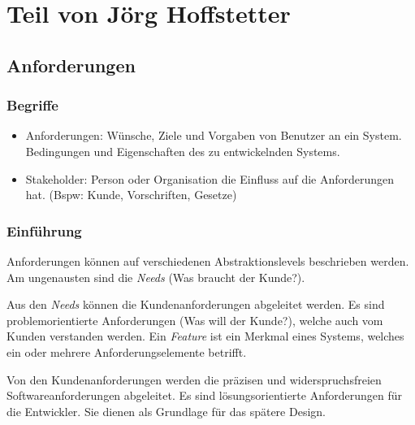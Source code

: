 \chapter{Teil von Jörg Hoffstetter}

\section{Anforderungen}

\subsection{Begriffe}
\begin{itemize}
	\item Anforderungen: Wünsche, Ziele und Vorgaben von Benutzer an ein System. Bedingungen und Eigenschaften des zu entwickelnden Systems.
	\item Stakeholder: Person oder Organisation die Einfluss auf die Anforderungen hat. (Bspw: Kunde, Vorschriften, Gesetze)
\end{itemize}

\subsection{Einführung}

Anforderungen können auf verschiedenen Abstraktionslevels beschrieben werden. Am ungenausten sind die \emph{Needs} (Was braucht der Kunde?).

Aus den \emph{Needs} können die Kundenanforderungen abgeleitet werden. Es sind problemorientierte Anforderungen (Was will der Kunde?), welche auch vom Kunden verstanden werden. Ein \emph{Feature} ist ein Merkmal eines Systems, welches ein oder mehrere Anforderungselemente betrifft.

Von den Kundenanforderungen werden die präzisen und widerspruchsfreien Softwareanforderungen abgeleitet. Es sind lösungsorientierte Anforderungen für die Entwickler. Sie dienen als Grundlage für das spätere Design.


